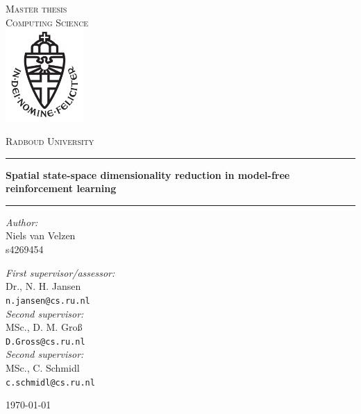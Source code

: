 \documentclass[11pt,a4paper]{report}
\begin{document}
\begin{titlepage}
\begin{center}
\textsc{\LARGE Master thesis\\Computing Science}\\[1.5cm]
\includegraphics[height=100pt]{logo}

\vspace{0.4cm}
\textsc{\Large Radboud University}\\[1cm]
\hrule
\vspace{0.4cm}
\textbf{\huge Spatial state-space dimensionality reduction in model-free reinforcement learning}\\[0.4cm]
\hrule
\vspace{2cm}
\begin{minipage}[t]{0.45\textwidth}
\begin{flushleft} \large
\textit{Author:}\\
Niels van Velzen\\
s4269454
\end{flushleft}
\end{minipage}
\begin{minipage}[t]{0.45\textwidth}
\begin{flushright} \large
\textit{First supervisor/assessor:}\\
Dr., N. H. Jansen\\
\texttt{n.jansen@cs.ru.nl}\\[1.3cm]
\textit{Second supervisor:}\\
MSc., D. M. Gro{\ss}\\
\texttt{D.Gross@cs.ru.nl}\\[1.3cm]
\textit{Second supervisor:}\\
MSc., C. Schmidl\\
\texttt{c.schmidl@cs.ru.nl}\\[1.3cm]
\end{flushright}
\end{minipage}
\vfill
{\large \today}
\end{center}
\end{titlepage}



\tableofcontents










\appendix

\end{document}
